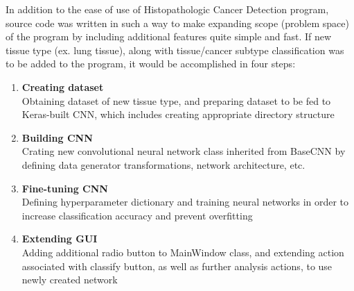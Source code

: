 In addition to the ease of use of Histopathologic Cancer Detection program, source code was written in such a way to make expanding scope (problem space) of the program by including additional features quite simple and fast. If new tissue type (ex. lung tissue), along with tissue/cancer subtype classification was to be added to the program, it would be accomplished in four steps:
\begin{enumerate}
	\itemsep 0em
	\item \textbf{Creating dataset} \\
	Obtaining dataset of new tissue type, and preparing dataset to be fed to Keras-built CNN, which includes creating appropriate directory structure
	\item \textbf{Building CNN} \\
	Crating new convolutional neural network class inherited from BaseCNN by defining data generator transformations, network architecture, etc.
	\item \textbf{Fine-tuning CNN} \\
	Defining hyperparameter dictionary and training neural networks in order to increase classification accuracy and prevent overfitting
	\item \textbf{Extending GUI} \\
	Adding additional radio button to MainWindow class, and extending action associated with classify button, as well as further analysis actions, to use newly created network
\end{enumerate}